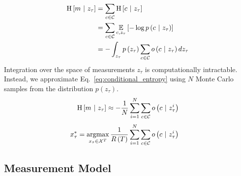\documentclass{article}
\begin{document}
%
\begin{align}
  \begin{split}
    \text{H}
    \left[
      m
      \ \vert \
      z_{\tau}
    \right]
    &=
    \sum_{c \in \mc{C}}
    \text{H}
    \left[
      c
      \ \vert \
      z_{\tau}
    \right]
    \\
    &=
    \sum_{c \in \mc{C}}
    \expect_{c, z_{\tau}}
    \left[
      -\log
      p
      \left(
      c
      \ \vert \
      z_{\tau}
      \right)
    \right]
    \\
    &=
    -
    \int_{z_{\tau}}
    p
    \left(
    z_{\tau}
    \right)
    \sum_{c \in \mc{C}}
    o
    \left(
    c
    \ \vert \
    z_{\tau}
    \right)
    d z_{\tau}
    \label{eq:conditional_entropy}
  \end{split}
\end{align}
%
Integration over the space of measurements $z_{\tau}$ is computationally intractable. Instead, we approximate Eq.~\eqref{eq:conditional_entropy} using $N$ Monte Carlo samples from the distribution $p(z_{\tau})$.
%
\begin{align}
  \begin{split}
    \text{H}
    \left[
      m
      \ \vert \
      z_{\tau}
    \right]
    &\approx
    -\frac{1}{N}
    \sum_{i=1}^{N}
    \sum_{c \in \mathcal{C}}
    o
    \left(
    c
    \ \vert \
    z_{\tau}^{i}
    \right)
    \\
  \end{split}
\end{align}
%
\begin{align}
  \begin{split}
    x_{\tau}^{*}
    &=
    \argmax_{x_{\tau} \in \mc{X}^{T}}
    \frac{1}{R\left(T\right)}
    \sum_{i=1}^{N}
    \sum_{c \in \mc{C}}
    o
    \left(
    c \ \vert \ z_{\tau}^{i}
    \right)
  \end{split}
\end{align}
%
\subsection{Measurement Model}
\end{document}
